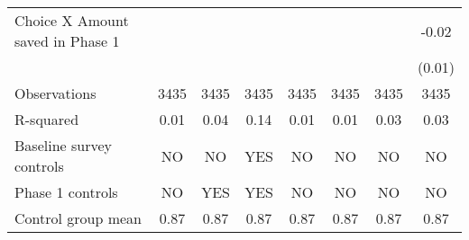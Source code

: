 \begin{tabular}{l c c c c c c c}
\addlinespace
Choice X Amount saved in Phase 1&            &            &            &            &            &            &       -0.02\\
                    &            &            &            &            &            &            &      (0.01)\\
\midrule
Observations        &        3435&        3435&        3435&        3435&        3435&        3435&        3435\\
R-squared           &        0.01&        0.04&        0.14&        0.01&        0.01&        0.03&        0.03\\
Baseline survey controls&          NO&          NO&         YES&          NO&          NO&          NO&          NO\\
Phase 1 controls    &          NO&         YES&         YES&          NO&          NO&          NO&          NO\\
Control group mean  &        0.87&        0.87&        0.87&        0.87&        0.87&        0.87&        0.87\\
\bottomrule \end{tabular} 